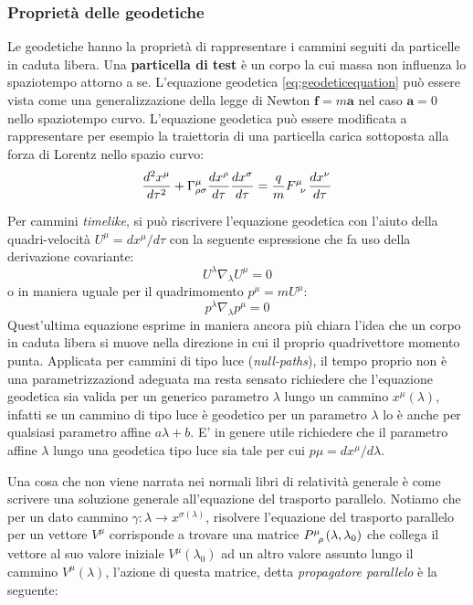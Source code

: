 \documentclass[twoside]{article}
\begin{document}
\subsubsection{Proprietà delle geodetiche}
Le geodetiche hanno la proprietà di rappresentare i cammini seguiti da particelle in caduta libera. Una \textbf{particella di test} è un corpo la cui massa non influenza lo spaziotempo attorno a se. L'equazione geodetica \ref{eq:geodeticequation} può essere vista come una generalizzazione della legge di Newton $\mathbf{f}=m\mathbf{a}$ nel caso $\mathbf{a}=0$  nello spaziotempo curvo. L'equazione geodetica può essere modificata a rappresentare per esempio la traiettoria di una particella carica sottoposta alla forza di Lorentz nello spazio curvo:
\begin{equation}\label{eq:geodeticlorentz}
	\frac{d^2 x^\mu}{d\tau^2} + \Gamma^{\mu}_{\rho \sigma}\frac{dx^\rho}{d\tau}\frac{dx^\sigma}{d\tau} = \frac{q}{m}F\indices{^\mu_\nu}\frac{dx^\nu}{d\tau}
\end{equation}

Per cammini \emph{timelike}, si può riscrivere l'equazione geodetica con l'aiuto della quadri-velocità $U^{\mu}=dx^\mu/d\tau$ con la seguente espressione che fa uso della derivazione covariante:
\begin{equation}
	U^\lambda \nabla_\lambda U^\mu = 0
\end{equation}
o in maniera uguale per il quadrimomento $p^\mu=m U^\mu$:
\begin{equation}
	p^\lambda \nabla_\lambda p^\mu = 0
\end{equation}
Quest'ultima equazione esprime in maniera ancora più chiara l'idea che un corpo in caduta libera si muove nella direzione in cui il proprio quadrivettore momento punta. Applicata per cammini di tipo luce (\emph{null-paths}), il tempo proprio non è una parametrizzaziond adeguata ma resta sensato richiedere che l'equazione geodetica sia valida per un generico parametro $\lambda$ lungo un cammino $x^\mu(\lambda)$, infatti se un cammino di tipo luce è geodetico per un parametro $\lambda$ lo è anche per qualsiasi parametro affine $a\lambda + b$. E' in genere utile richiedere che il parametro affine $\lambda$ lungo una geodetica tipo luce sia tale per cui $p\mu=dx^\mu/d\lambda$.

Una cosa che non viene narrata nei normali libri di relatività generale è come scrivere una soluzione generale all'equazione del trasporto parallelo. Notiamo che per un dato cammino $\gamma : \lambda  \rightarrow x^{\sigma(\lambda)}$, risolvere l'equazione del trasporto parallelo per un vettore $V^\mu$ corrisponde a trovare una matrice $P\indices{^\mu_\rho}(\lambda,\lambda_0)$ che collega il vettore al suo valore iniziale $V^{\mu}(\lambda_0)$ ad un altro valore assunto lungo il cammino $V^{\mu}(\lambda)$, l'azione di questa matrice, detta \emph{propagatore parallelo} è la seguente:
\end{document}
